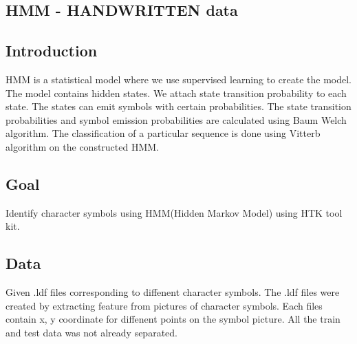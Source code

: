 \begin{center}
\section{HMM - HANDWRITTEN data}
\end{center}

\subsection{Introduction}
\begin{flushleft}
  HMM is a statistical model where we use supervised learning to create the model.
  The model contains hidden states. We attach state transition probability to each state.
  The states can emit symbols with certain probabilities. \break
  The state transition probabilities and 
  symbol emission probabilities are calculated using Baum Welch algorithm.
  The classification of a particular sequence is done using Vitterb algorithm on the constructed HMM.
\end{flushleft}

\subsection{Goal}
\begin{flushleft}
    Identify character symbols using HMM(Hidden Markov Model) using HTK tool kit.
\end{flushleft}

\subsection{Data}
\begin{flushleft}
    Given .ldf files corresponding to diffenent character symbols.
  The .ldf files were created by extracting feature from pictures of character symbols.
  Each files contain x, y coordinate for diffenent points on the symbol picture.
  All the train and test data was not already separated.
\end{flushleft}



